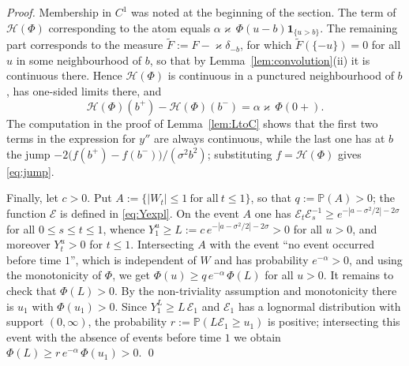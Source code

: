 \documentclass[10pt,a4paper]{amsart}
\newcommand{\Ind}{\mathbf{1}}
\newcommand{\bbp}{\mathbb{P}}
\begin{document}
\begin{proof}
Membership in $C^1$ was noted at the beginning of the section. The term of
$\mathcal H(\Phi)$ corresponding to the atom equals
$\alpha\varkappa\,\Phi(u-b)\Ind_{\{u>b\}}$. The remaining part corresponds to
the measure $\widetilde F:=F-\varkappa\delta_{-b}$, for which
$\widetilde F(\{-u\})=0$ for all $u$ in some neighbourhood of $b$, so that by
Lemma~\ref{lem:convolution}{\rm(ii)} it is continuous there. Hence
$\mathcal H(\Phi)$ is continuous in a punctured neighbourhood of $b$, has
one-sided limits there, and
$$
\mathcal H(\Phi)(b^+)-\mathcal H(\Phi)(b^-)=\alpha\varkappa\,\Phi(0+) .
$$
The computation in the proof of Lemma~\ref{lem:LtoC} shows that the first two
terms in the expression for $y''$ are always continuous, while the last one has
at $b$ the jump $-2\bigl(f(b^+)-f(b^-)\bigr)/(\sigma^2b^2)$; substituting
$f=\mathcal H(\Phi)$ gives \eqref{eq:jump}.

Finally, let $c>0$. Put $A:=\{|W_t|\le1\ \text{for all}\ t\le1\}$, so that
$q:=\bbp(A)>0$; the function $\mathcal E$ is defined in \eqref{eq:Yexpl}. On
the event $A$ one has
$\mathcal E_t\mathcal E_s^{-1}\ge e^{-|a-\sigma^2/2|-2\sigma}$ for all
$0\le s\le t\le1$, whence
$Y^u_1\ge L:=c\,e^{-|a-\sigma^2/2|-2\sigma}>0$ for all $u>0$, and moreover
$Y^u_t>0$ for $t\le1$. Intersecting $A$ with the event ``no event occurred
before time $1$'', which is independent of $W$ and has probability
$e^{-\alpha}>0$, and using the monotonicity of $\Phi$, we get
$\Phi(u)\ge q\,e^{-\alpha}\,\Phi(L)$ for all $u>0$. It remains to check that
$\Phi(L)>0$. By the non-triviality assumption and monotonicity there is $u_1$
with $\Phi(u_1)>0$. Since $Y^{L}_1\ge L\,\mathcal E_1$ and $\mathcal E_1$ has a
lognormal distribution with support $(0,\infty)$, the probability
$r:=\bbp(L\mathcal E_1\ge u_1)$ is positive; intersecting this event with the
absence of events before time $1$ we obtain
$\Phi(L)\ge r\,e^{-\alpha}\,\Phi(u_1)>0$.
\qed
\end{proof}
\end{document}
